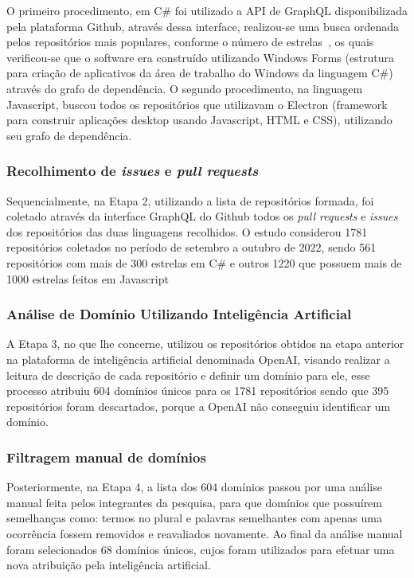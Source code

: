 \documentclass[12pt]{article}
\begin{document}
O primeiro procedimento, em C\# foi utilizado a API de GraphQL disponibilizada pela plataforma Github, através dessa interface, realizou-se uma busca ordenada pelos repositórios mais populares, conforme o número de estrelas~\cite{DBLP:journals/corr/abs-1811-07643}, os quais verificou-se que o software era construído utilizando Windows Forms (estrutura para criação de aplicativos da área de trabalho do Windows da linguagem C\#) através do grafo de dependência. O segundo procedimento, na linguagem Javascript, buscou todos os repositórios que utilizavam o Electron (framework para construir aplicações desktop usando Javascript, HTML e CSS), utilizando seu grafo de dependência.

\subsubsection{Recolhimento de \textit{issues} e \textit{pull requests}}

Sequencialmente, na Etapa 2, utilizando a lista de repositórios formada, foi coletado através da interface GraphQL do Github todos os \textit{pull requests} e \textit{issues} dos repositórios das duas linguagens recolhidos. O estudo considerou 1781 repositórios coletados no período de setembro a outubro de 2022, sendo 561 repositórios com mais de 300 estrelas em C\# e outros 1220 que possuem mais de 1000 estrelas feitos em Javascript

\subsubsection{Análise de Domínio Utilizando Inteligência Artificial}

A Etapa 3, no que lhe concerne, utilizou os repositórios obtidos na etapa anterior na plataforma de inteligência artificial denominada OpenAI, visando realizar a leitura de descrição de cada repositório e definir um domínio para ele, esse processo atribuiu 604 domínios únicos para os 1781 repositórios sendo que 395 repositórios foram descartados, porque a OpenAI não conseguiu identificar um domínio.

\subsubsection{Filtragem manual de domínios}

Posteriormente, na Etapa 4, a lista dos 604 domínios passou por uma análise manual feita pelos integrantes da pesquisa, para que domínios que possuírem semelhanças como: termos no plural e palavras semelhantes com apenas uma ocorrência fossem removidos e reavaliados novamente. Ao final da análise manual foram selecionados 68 domínios únicos, cujos foram utilizados para efetuar uma nova atribuição pela inteligência artificial.
\end{document}
